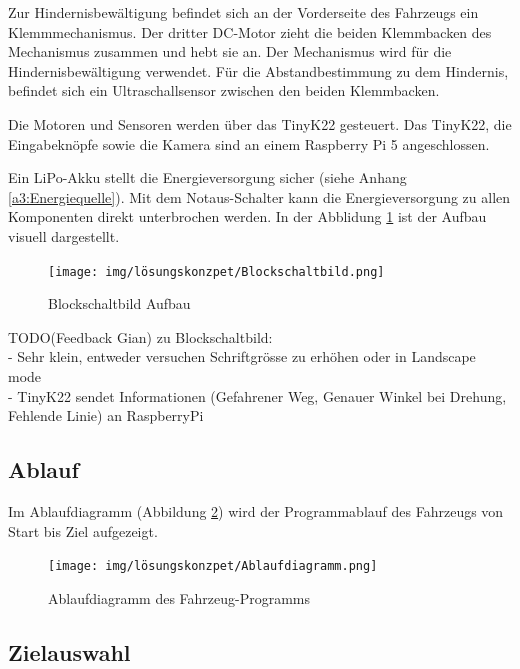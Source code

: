 \documentclass[../main.tex]{subfiles}
\begin{document}
Zur Hindernisbewältigung befindet sich an der Vorderseite des Fahrzeugs ein Klemmmechanismus. Der dritter DC-Motor zieht die beiden Klemmbacken des Mechanismus zusammen und hebt sie an. Der Mechanismus wird für die Hindernisbewältigung verwendet. Für die Abstandbestimmung zu dem Hindernis, befindet sich ein Ultraschallsensor zwischen den beiden Klemmbacken. 

Die Motoren und Sensoren werden über das TinyK22 gesteuert.
Das TinyK22, die Eingabeknöpfe sowie die Kamera sind an einem Raspberry Pi 5 angeschlossen.

Ein LiPo-Akku stellt die Energieversorgung sicher (siehe Anhang \ref{a3:Energiequelle}).
Mit dem Notaus-Schalter kann die Energieversorgung zu allen Komponenten direkt unterbrochen werden.
In der Abblidung \ref{img:Blockschaltbild-Aufbau} ist der Aufbau visuell dargestellt.
\newline
\newline
\begin{figure}[H]
\centering
\texttt{[image: img/lösungskonzpet/Blockschaltbild.png]}
\caption{Blockschaltbild Aufbau}
\label{img:Blockschaltbild-Aufbau}
\end{figure}

{\color{red} TODO(Feedback Gian) zu Blockschaltbild:} \\
- Sehr klein, entweder versuchen Schriftgrösse zu erhöhen oder in Landscape mode \\
- TinyK22 sendet Informationen (Gefahrener Weg, Genauer Winkel bei Drehung, Fehlende Linie) an RaspberryPi \\

\newpage
\subsection{Ablauf}

Im Ablaufdiagramm (Abbildung \ref{img:ablaufdiagramm}) wird der Programmablauf des Fahrzeugs von Start bis Ziel aufgezeigt.

\begin{figure}[H]
\texttt{[image: img/lösungskonzpet/Ablaufdiagramm.png]}
\caption{Ablaufdiagramm des Fahrzeug-Programms}
\label{img:ablaufdiagramm}
\end{figure}

\newpage
\subsection{Zielauswahl}
\end{document}
